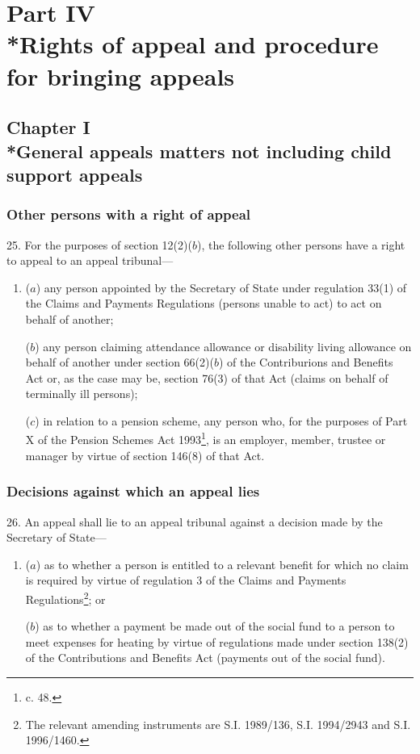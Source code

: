 \documentclass[12pt,a4paper]{article}
\begin{document}
\section[Part IV --- Rights of appeal and procedure for bringing appeals]{Part IV\\*Rights of appeal and procedure for bringing appeals}

\subsection[Chapter I --- General appeals matters not including child support appeals]{Chapter I\\*General appeals matters not including child support appeals}

\renewcommand\parthead{--- Part IV Chapter I}

\subsubsection[25. Other persons with a right of appeal]{Other persons with a right of appeal}

25.  For the purposes of section 12(2)($b$), the following other persons have a right to appeal to an appeal tribunal—
\begin{enumerate}\item[]
($a$) any person appointed by the Secretary of State under regulation 33(1) of the Claims and Payments Regulations (persons unable to act) to act on behalf of another;

($b$) any person claiming attendance allowance or disability living allowance on behalf of another under section 66(2)($b$) of the Contriburions and Benefits Act or, as the case may be, section 76(3) of that Act (claims on behalf of terminally ill persons);

($c$) in relation to a pension scheme, any person who, for the purposes of Part X of the Pension Schemes Act 1993\footnote{ c. 48.}, is an employer, member, trustee or manager by virtue of section 146(8) of that Act.
\end{enumerate}

\subsubsection[26. Decisions against which an appeal lies]{Decisions against which an appeal lies}

26.  An appeal shall lie to an appeal tribunal against a decision made by the Secretary of State—
\begin{enumerate}\item[]
($a$) as to whether a person is entitled to a relevant benefit for which no claim is required by virtue of regulation 3 of the Claims and Payments Regulations\footnote{\frenchspacing The relevant amending instruments are S.I. 1989/136, S.I. 1994/2943 and S.I. 1996/1460.}; or

($b$) as to whether a payment be made out of the social fund to a person to meet expenses for heating by virtue of regulations made under section 138(2) of the Contributions and Benefits Act (payments out of the social fund).
\end{enumerate}
\end{document}
